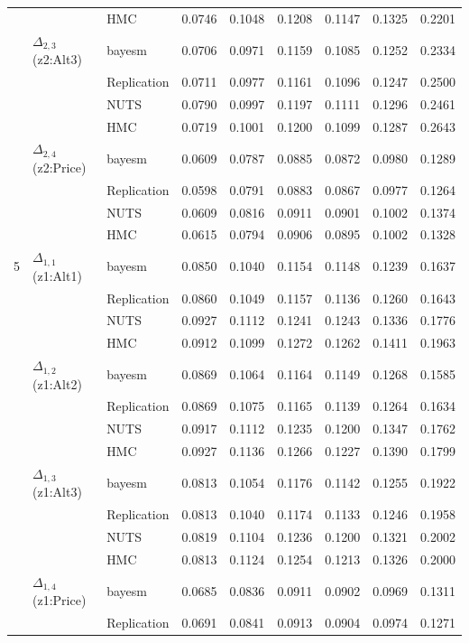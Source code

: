 \begin{longtable}{cllcccccc}
 &  & HMC & 0.0746 & 0.1048 & 0.1208 & 0.1147 & 0.1325 & 0.2201 \\
 & $\Delta_{2,3}$ (z2:Alt3) & bayesm & 0.0706 & 0.0971 & 0.1159 & 0.1085 & 0.1252 & 0.2334 \\
 &  & Replication & 0.0711 & 0.0977 & 0.1161 & 0.1096 & 0.1247 & 0.2500 \\
 &  & NUTS & 0.0790 & 0.0997 & 0.1197 & 0.1111 & 0.1296 & 0.2461 \\
 &  & HMC & 0.0719 & 0.1001 & 0.1200 & 0.1099 & 0.1287 & 0.2643 \\
 & $\Delta_{2,4}$ (z2:Price) & bayesm & 0.0609 & 0.0787 & 0.0885 & 0.0872 & 0.0980 & 0.1289 \\
 &  & Replication & 0.0598 & 0.0791 & 0.0883 & 0.0867 & 0.0977 & 0.1264 \\
 &  & NUTS & 0.0609 & 0.0816 & 0.0911 & 0.0901 & 0.1002 & 0.1374 \\
 &  & HMC & 0.0615 & 0.0794 & 0.0906 & 0.0895 & 0.1002 & 0.1328 \\
5 & $\Delta_{1,1}$ (z1:Alt1) & bayesm & 0.0850 & 0.1040 & 0.1154 & 0.1148 & 0.1239 & 0.1637 \\
 &  & Replication & 0.0860 & 0.1049 & 0.1157 & 0.1136 & 0.1260 & 0.1643 \\
 &  & NUTS & 0.0927 & 0.1112 & 0.1241 & 0.1243 & 0.1336 & 0.1776 \\
 &  & HMC & 0.0912 & 0.1099 & 0.1272 & 0.1262 & 0.1411 & 0.1963 \\
 & $\Delta_{1,2}$ (z1:Alt2) & bayesm & 0.0869 & 0.1064 & 0.1164 & 0.1149 & 0.1268 & 0.1585 \\
 &  & Replication & 0.0869 & 0.1075 & 0.1165 & 0.1139 & 0.1264 & 0.1634 \\
 &  & NUTS & 0.0917 & 0.1112 & 0.1235 & 0.1200 & 0.1347 & 0.1762 \\
 &  & HMC & 0.0927 & 0.1136 & 0.1266 & 0.1227 & 0.1390 & 0.1799 \\
 & $\Delta_{1,3}$ (z1:Alt3) & bayesm & 0.0813 & 0.1054 & 0.1176 & 0.1142 & 0.1255 & 0.1922 \\
 &  & Replication & 0.0813 & 0.1040 & 0.1174 & 0.1133 & 0.1246 & 0.1958 \\
 &  & NUTS & 0.0819 & 0.1104 & 0.1236 & 0.1200 & 0.1321 & 0.2002 \\
 &  & HMC & 0.0813 & 0.1124 & 0.1254 & 0.1213 & 0.1326 & 0.2000 \\
 & $\Delta_{1,4}$ (z1:Price) & bayesm & 0.0685 & 0.0836 & 0.0911 & 0.0902 & 0.0969 & 0.1311 \\
 &  & Replication & 0.0691 & 0.0841 & 0.0913 & 0.0904 & 0.0974 & 0.1271 \\

\end{longtable}
